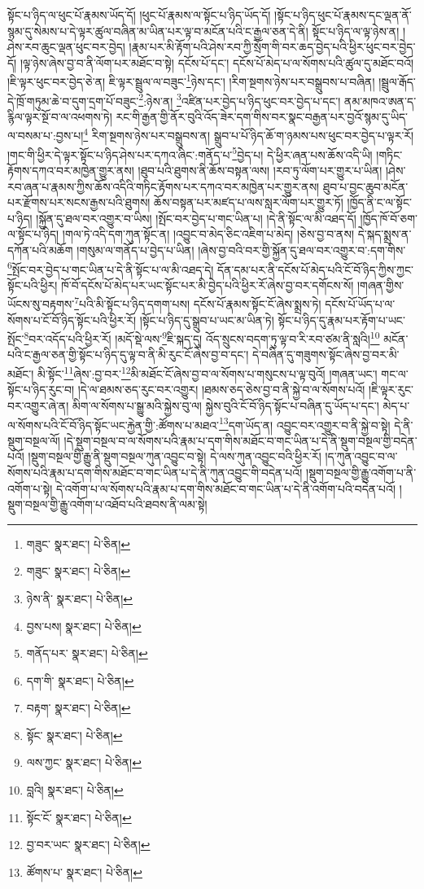 སྟོང་པ་ཉིད་ལ་ཕུང་པོ་རྣམས་ཡོད་དོ། །ཕུང་པོ་རྣམས་ལ་སྟོང་པ་ཉིད་ཡོད་དོ། །སྟོང་པ་ཉིད་ཕུང་པོ་རྣམས་དང་ལྡན་ནོ་སྙམ་དུ་སེམས་པ་དེ་ལྟར་ཚུལ་བཞིན་མ་ཡིན་པར་ལྟ་བ་མངོན་པའི་ང་རྒྱལ་ཅན་དེ་ནི། སྟོང་པ་ཉིད་ལ་ལྟ་ཉེས་ན། །ཤེས་རབ་ཆུང་ལྡན་ཕུང་བར་བྱེད། །རྣམ་པར་མི་རྟོག་པའི་ཤེས་རབ་ཀྱི་སྲོག་གི་བར་ཆད་བྱེད་པའི་ཕྱིར་ཕུང་བར་བྱེད་དོ། །ལྟ་ཉེས་ཞེས་བྱ་བ་ནི་ལོག་པར་མཐོང་བ་སྟེ། དངོས་པོ་དང་། དངོས་པོ་མེད་པ་ལ་སོགས་པའི་ཚུལ་དུ་མཐོང་བའོ། །ཇི་ལྟར་ཕུང་བར་བྱེད་ཅེ་ན། ཇི་ལྟར་སྦྲུལ་ལ་བཟུང་\footnote{གཟུང་  སྣར་ཐང་།  པེ་ཅིན། }ཉེས་དང་། །རིག་སྔགས་ཉེས་པར་བསྒྲུབས་པ་བཞིན། །སྦྲུལ་རྒོད་དེ་ཁྲོ་གཏུམ་ཆེ་བ་དུག་དྲག་པོ་བཟུང་\footnote{གཟུང་  སྣར་ཐང་།  པེ་ཅིན། }:ཉེས་ན། \footnote{ཉེས་ནི་  སྣར་ཐང་།  པེ་ཅིན། }འཛིན་པར་བྱེད་པ་ཉིད་ཕུང་བར་བྱེད་པ་དང་། ནམ་མཁའ་ཨན་ད་རྙིལ་ལྟར་སྔོ་བ་ལ་འཕགས་ཏེ། རང་གི་རྒྱན་གྱི་ནོར་བུའི་འོད་ཟེར་དག་གིས་བར་སྣང་བརྒྱན་པར་བྱའོ་སྙམ་དུ་ཡིད་ལ་བསམ་པ་:བྱས་པ།\footnote{བྱས་པས།  སྣར་ཐང་།  པེ་ཅིན། } རིག་སྔགས་ཉེས་པར་བསྒྲུབས་ན། སྒྲུབ་པ་པོ་ཉིད་ཆོ་ག་ཉམས་པས་ཕུང་བར་བྱེད་པ་ལྟར་རོ། །གང་གི་ཕྱིར་དེ་ལྟར་སྟོང་པ་ཉིད་ཤེས་པར་དཀའ་ཞིང་:གནོད་པ་\footnote{གནོད་པར་  སྣར་ཐང་།  པེ་ཅིན། }བྱེད་པ། དེ་ཕྱིར་ཞན་པས་ཆོས་འདི་ཡི། །གཏིང་རྟོགས་དཀའ་བར་མཁྱེན་གྱུར་ནས། །ཐུབ་པའི་ཐུགས་ནི་ཆོས་བསྟན་ལས། །རབ་ཏུ་ལོག་པར་གྱུར་པ་ཡིན། །ཤེས་རབ་ཞན་པ་རྣམས་ཀྱིས་ཆོས་འདིའི་གཏིང་རྟོགས་པར་དཀའ་བར་མཁྱེན་པར་གྱུར་ནས། ཐུབ་པ་བྱང་ཆུབ་མངོན་པར་རྫོགས་པར་སངས་རྒྱས་པའི་ཐུགས། ཆོས་བསྟན་པར་མཛད་པ་ལས་སླར་ལོག་པར་གྱུར་ཏོ། །ཁྱོད་ནི་ང་ལ་སྟོང་པ་ཉིད། །སྐྱོན་དུ་ཐལ་བར་འགྱུར་བ་ཡིས། །སྤོང་བར་བྱེད་པ་གང་ཡིན་པ། །དེ་ནི་སྟོང་ལ་མི་འཐད་དོ། །ཁྱོད་ཁོ་བོ་ཅག་ལ་སྟོང་པ་ཉིད། །གལ་ཏེ་འདི་དག་ཀུན་སྟོང་ན། །འབྱུང་བ་མེད་ཅིང་འཇིག་པ་མེད། །ཅེས་བྱ་བ་ནས། དེ་སྐད་སྨྲས་ན་དཀོན་པའི་མཆོག །གསུམ་ལ་གནོད་པ་བྱེད་པ་ཡིན། །ཞེས་བྱ་བའི་བར་གྱི་སྐྱོན་དུ་ཐལ་བར་འགྱུར་བ་:དག་གིས་\footnote{དག་གི་  སྣར་ཐང་།  པེ་ཅིན། }སྤོང་བར་བྱེད་པ་གང་ཡིན་པ་དེ་ནི་སྟོང་པ་ལ་མི་འཐད་དེ། དོན་དམ་པར་ནི་དངོས་པོ་མེད་པའི་ངོ་བོ་ཉིད་ཀྱིས་ཀྱང་སྟོང་པའི་ཕྱིར། ཁོ་བོ་དངོས་པོ་མེད་པར་ཡང་སྟོང་པར་མི་བྱེད་པའི་ཕྱིར་རོ་ཞེས་བྱ་བར་དགོངས་སོ། །གཞན་གྱིས་ཡོངས་སུ་བརྟགས་\footnote{བརྟག་  སྣར་ཐང་།  པེ་ཅིན། }པའི་མི་སྟོང་པ་ཉིད་དགག་པས། དངོས་པོ་རྣམས་སྟོང་ངོ་ཞེས་སྨྲས་ཏེ། དངོས་པོ་ཡོད་པ་ལ་སོགས་པ་ངོ་བོ་ཉིད་སྟོང་པའི་ཕྱིར་རོ། །སྟོང་པ་ཉིད་དུ་སྒྲུབ་པ་ཡང་མ་ཡིན་ཏེ། སྟོང་པ་ཉིད་དུ་རྣམ་པར་རྟོག་པ་ཡང་སྤོང་\footnote{སྟོང་  སྣར་ཐང་།  པེ་ཅིན། }བར་འདོད་པའི་ཕྱིར་རོ། །མདོ་སྡེ་ལས་\footnote{ལས་ཀྱང་  སྣར་ཐང་།  པེ་ཅིན། }ཇི་སྐད་དུ། འོད་སྲུངས་བདག་ཏུ་ལྟ་བ་རི་རབ་ཙམ་ནི་སླའི།\footnote{བླའི།  སྣར་ཐང་།  པེ་ཅིན། } མངོན་པའི་ང་རྒྱལ་ཅན་གྱི་སྟོང་པ་ཉིད་དུ་ལྟ་བ་ནི་མི་རུང་ངོ་ཞེས་བྱ་བ་དང་། དེ་བཞིན་དུ་གཟུགས་སྟོང་ཞེས་བྱ་བར་མི་མཐོང་། མི་སྟོང་\footnote{སྟོང་ངོ་  སྣར་ཐང་།  པེ་ཅིན། }ཞེས་:བྱ་བར་\footnote{བྱ་བར་ཡང་  སྣར་ཐང་།  པེ་ཅིན། }མི་མཐོང་ངོ་ཞེས་བྱ་བ་ལ་སོགས་པ་གསུངས་པ་ལྟ་བུའོ། །གཞན་ཡང་། གང་ལ་སྟོང་པ་ཉིད་རུང་བ། །དེ་ལ་ཐམས་ཅད་རུང་བར་འགྱུར། །ཐམས་ཅད་ཅེས་བྱ་བ་ནི་སྐྱེ་བ་ལ་སོགས་པའོ། །ཇི་ལྟར་རུང་བར་འགྱུར་ཞེ་ན། མིག་ལ་སོགས་པ་སྒྱུ་མའི་སྐྱེས་བུ་ལ། སྐྱེས་བུའི་ངོ་བོ་ཉིད་སྟོང་པ་བཞིན་དུ་ཡོད་པ་དང་། མེད་པ་ལ་སོགས་པའི་ངོ་བོ་ཉིད་སྟོང་ཡང་རྐྱེན་གྱི་:ཚོགས་པ་མཐའ་\footnote{ཚོགས་པ་  སྣར་ཐང་།  པེ་ཅིན། }དག་ཡོད་ན། འབྱུང་བར་འགྱུར་བ་ནི་སྐྱེ་བ་སྟེ། དེ་ནི་སྡུག་བསྔལ་ལོ། །དེ་སྡུག་བསྔལ་བ་ལ་སོགས་པའི་རྣམ་པ་དག་གིས་མཐོང་བ་གང་ཡིན་པ་དེ་ནི་སྡུག་བསྔལ་གྱི་བདེན་པའོ། །སྡུག་བསྔལ་གྱི་རྒྱུ་ནི་སྡུག་བསྔལ་ཀུན་འབྱུང་བ་སྟེ། དེ་ལས་ཀུན་འབྱུང་བའི་ཕྱིར་རོ། །ད་ཀུན་འབྱུང་བ་ལ་སོགས་པའི་རྣམ་པ་དག་གིས་མཐོང་བ་གང་ཡིན་པ་དེ་ནི་ཀུན་འབྱུང་གི་བདེན་པའོ། །སྡུག་བསྔལ་གྱི་རྒྱུ་འགོག་པ་ནི་འགོག་པ་སྟེ། དེ་འགོག་པ་ལ་སོགས་པའི་རྣམ་པ་དག་གིས་མཐོང་བ་གང་ཡིན་པ་དེ་ནི་འགོག་པའི་བདེན་པའོ། །སྡུག་བསྔལ་གྱི་རྒྱུ་འགོག་པ་འཐོབ་པའི་ཐབས་ནི་ལམ་སྟེ། 